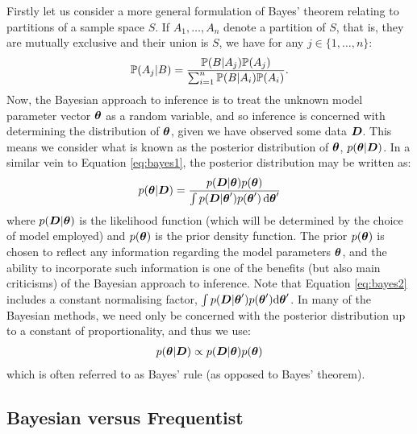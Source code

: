 Firstly let us consider a more general formulation of Bayes' theorem relating to partitions of a sample space \(S\).
If \(A_1, \ldots, A_n\) denote a partition of \(S\), that is, they are mutually exclusive and their union is \(S\), we
have for any \(j \in \{1, \ldots, n\}\):
\begin{align} 
\mathbb{P}(A_j | B) = \frac{\mathbb{P}(B | A_j) \mathbb{P}(A_j)}{\sum_{i=1}^n \mathbb{P}(B | A_i) \mathbb{P}(A_i)}.
\label{eq:bayes1}
\end{align}
Now, the Bayesian approach to inference is to treat the unknown model parameter vector \(\boldsymbol{\theta}\) as a random
variable, and so inference is concerned with determining the distribution of \(\boldsymbol{\theta}\), given we have observed some
data \(\boldsymbol{D}\). This means we consider what is known as the posterior distribution of \(\boldsymbol{\theta}\), \(p(\boldsymbol{\theta} |
\boldsymbol{D})\). In a similar vein to Equation \eqref{eq:bayes1}, the posterior distribution may be written as:
\begin{align}
\label{eq:bayes2}
p(\boldsymbol{\theta} | \boldsymbol{D}) = \frac{p(\boldsymbol{D} | \boldsymbol{\theta}) p(\boldsymbol{\theta})}{\int p(\boldsymbol{D} | \boldsymbol{\theta}') p(\boldsymbol{\theta}') \, \mathrm{d}\boldsymbol{\theta}'}
\end{align}
where \(p(\boldsymbol{D} | \boldsymbol{\theta})\) is the likelihood function (which will be determined by the choice of model employed)
and \(p(\boldsymbol{\theta})\) is the prior density function. The prior \(p(\boldsymbol{\theta})\) is chosen to reflect any information
regarding the model parameters \(\boldsymbol{\theta}\), and the ability to incorporate such information is one of the benefits
(but also main criticisms) of the Bayesian approach to inference. Note that Equation \eqref{eq:bayes2} includes a
constant normalising factor, \(\int p(\boldsymbol{D} | \boldsymbol{\theta}') p(\boldsymbol{\theta}') \mathrm{d}\boldsymbol{\theta}'\). In many of the
Bayesian methods, we need only be concerned with the posterior distribution up to a constant of proportionality, and
thus we use:
\begin{align}
\label{eq:bayes_prop}
p(\boldsymbol{\theta} | \boldsymbol{D}) \propto p(\boldsymbol{D} | \boldsymbol{\theta}) p(\boldsymbol{\theta})
\end{align}
which is often referred to as Bayes' rule (as opposed to Bayes' theorem).

\subsection{Bayesian versus Frequentist}
\label{sec:Bayesian_versus_Frequentist}

